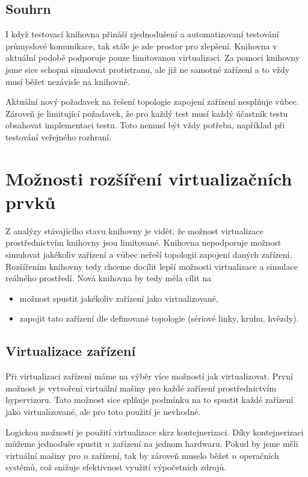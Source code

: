 \subsection{Souhrn}

I když testovací knihovna přináší zjednodušení a automatizovaní testování průmyslové komunikace, tak stále je zde prostor pro zlepšení. Knihovna v aktuální podobě podporuje pouze limitovanou virtualizaci. Za pomoci knihovny jsme sice schopni simulovat protistranu, ale již ne samotné zařízení a to vždy musí běžet nezávisle na knihovně. 

Aktuální nový požadavek na řešení topologie zapojení zařízení nesplňuje vůbec. Zároveň je limitující požadavek, že pro každý test musí každý účastník testu obsahovat implementaci testu. Toto nemusí být vždy potřeba, například při testování veřejného rozhraní.

\section{Možnosti rozšíření virtualizačních prvků}

Z analýzy stávajícího stavu knihovny je vidět, že možnost virtualizace prostřednictvím knihovny jsou limitované. Knihovna nepodporuje možnost simulovat jakékoliv zařízení a vůbec neřeší topologii zapojení daných zařízení. Rozšířením knihovny tedy chceme docílit lepší možnosti virtualizace a simulace reálného prostředí. Nová knihovna by tedy měla cílit na

\begin{itemize}
    \item možnost spustit jakékoliv zařízení jako virtualizované,
    \item zapojit tato zařízení dle definované topologie (sériové linky, kruhu, hvězdy).
\end{itemize}


\subsection{Virtualizace zařízení}

Při virtualizaci zařízení máme na výběr více možností jak virtualizovat. První možnost je vytvoření virtuální mašiny pro každé zařízení prostřednictvím hypervizoru. Tato možnost sice splňuje podmínku na to spustit každé zařízení jako virtualizované, ale pro toto použití je nevhodné. 

Logickou možností je použití virtualizace skrz kontejnerizaci. Díky kontejnerizaci můžeme jednoduše spustit $n$ zařízení na jednom hardwaru. Pokud by jsme měli virtuální mašiny pro $n$ zařízení, tak by zároveň muselo běžet $n$ operačních systémů, což snižuje efektivnost využití výpočetních zdrojů.

